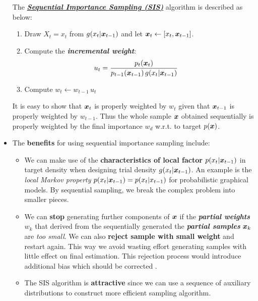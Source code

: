 \documentclass[11pt]{article}
\begin{document}
\begin{itemize}
The \underline{\emph{\textbf{Sequential Importance Sampling (SIS)}}} algorithm is described as below:
\begin{enumerate}
\item Draw $X_t = x_t$ from $g(x_t|\boldsymbol{x}_{t-1})$ and let $\boldsymbol{x}_t \leftarrow [x_t, \boldsymbol{x}_{t-1}]$.
\item Compute the \emph{\textbf{incremental weight}}:
\begin{align}
u_{t} &= \frac{p_t(\boldsymbol{x}_{t})}{p_{t-1}(\boldsymbol{x}_{t-1}) \, g(x_t|\boldsymbol{x}_{t-1})}
\end{align}
\item Compute $w_{t} \leftarrow w_{t-1}\,u_{t}$
\end{enumerate}
It is easy to show that $\boldsymbol{x}_t$ is properly weighted by $w_t$ given that $\boldsymbol{x}_{t-1}$ is properly weighted by $w_{t-1}$. Thus the whole sample $\boldsymbol{x}$ obtained sequentially is properly weighted by the  final importance $w_{d}$ w.r.t. to target $p(\boldsymbol{x})$.
 
\item The \textbf{benefits} for using sequential importance sampling include:
\begin{itemize}
\item We can make use of the \textbf{characteristics of local factor} $p(x_{t}| \boldsymbol{x}_{t-1})$ in target density when designing trial density $g(x_{t}| \boldsymbol{x}_{t-1})$. An example is the \emph{local Markov property} $p(x_{t}| \boldsymbol{x}_{t-1}) = p(x_{t}|x_{t-1})$ for probabilistic graphical models. By sequential sampling, we break the complex problem into smaller pieces.

\item We can \textbf{stop} generating further components of $\boldsymbol{x}$ if the \emph{\textbf{partial weights}} $w_{k}$ that derived from the sequentially generated the \emph{\textbf{partial samples}} $\boldsymbol{x}_{k}$ are \emph{too small}. We can also \textbf{reject sample with small weight} and restart again. This way we avoid wasting effort generating samples with little  effect on final estimation. This rejection process would introduce additional bias which should be corrected \citep{robert1999monte}.

\item The SIS algorithm is \textbf{attractive} since we can use a sequence of auxiliary distributions to construct more efficient sampling algorithm.
\end{itemize} 

\end{itemize}
\end{document}
